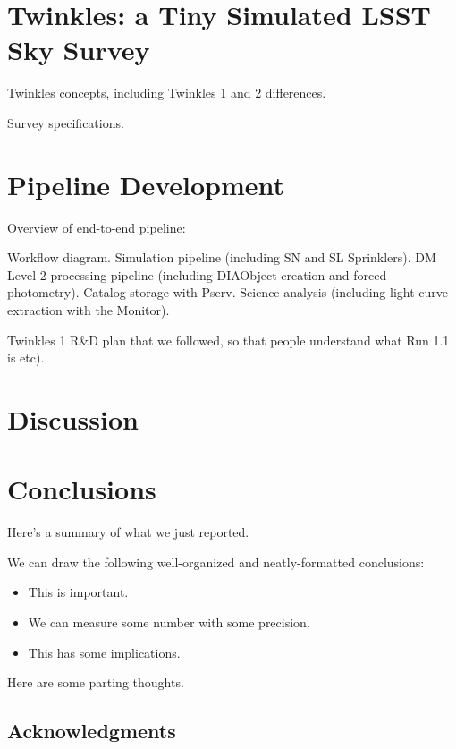 \documentclass[\docopts]{\docclass}
\begin{document}
\section{Twinkles: a Tiny Simulated LSST Sky Survey}
\label{sec:concepts}

Twinkles concepts, including Twinkles 1 and 2 differences.

Survey specifications.



\section{Pipeline Development}
\label{sec:pipeline}

Overview of end-to-end pipeline:

Workflow diagram. Simulation pipeline (including SN and SL Sprinklers).
DM Level 2 processing pipeline (including DIAObject creation and forced photometry).
Catalog storage with Pserv.
Science analysis (including light curve extraction with the Monitor).

Twinkles 1 R\&D plan that we followed, so that people understand what Run 1.1 is etc).





\section{Discussion}
\label{sec:discussion}



\section{Conclusions}
\label{sec:conclusions}

Here's a summary of what we just reported.

We can draw the following well-organized and neatly-formatted conclusions:
\begin{itemize}
  \item This is important.
  \item We can measure some number with some precision.
  \item This has some implications.
\end{itemize}

Here are some parting thoughts.



\subsection*{Acknowledgments}





\end{document}
